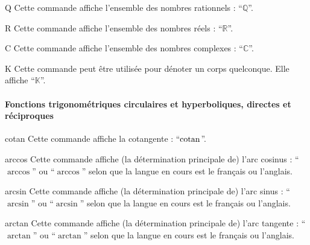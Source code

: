 \begin{docCommand}{Q}{}
  Cette commande affiche l'ensemble des nombres rationnels :
  \enquote{$\mathbb{Q}$}.
\end{docCommand}

\begin{docCommand}{R}{}
  Cette commande affiche l'ensemble des nombres réels : \enquote{$\mathbb{R}$}.
\end{docCommand}

\begin{docCommand}{C}{}
  Cette commande affiche l'ensemble des nombres complexes :
  \enquote{$\mathbb{C}$}.
\end{docCommand}

\begin{docCommand}{K}{}
  Cette commande peut être utilisée pour dénoter un corps quelconque. Elle
  affiche \enquote{$\mathbb{K}$}.
\end{docCommand}

\paragraph{Fonctions trigonométriques circulaires et hyperboliques, directes et
  réciproques}

\begin{docCommand}{cotan}{}
  Cette commande affiche la cotangente : \enquote{$\operatorname{cotan}$}.
\end{docCommand}

\begin{docCommand}{arccos}{}
  Cette commande affiche (la détermination principale de) l'arc cosinus :
  \enquote{$\arccos$} ou
  \enquote{$\arccos$} selon que
  la langue en cours est le français ou l'anglais.
\end{docCommand}

\begin{docCommand}{arcsin}{}
  Cette commande affiche (la détermination principale de) l'arc sinus :
  \enquote{$\arcsin$} ou
  \enquote{$\arcsin$} selon que
  la langue en cours est le français ou l'anglais.
\end{docCommand}

\begin{docCommand}{arctan}{}
  Cette commande affiche (la détermination principale de) l'arc tangente :
  \enquote{$\arctan$} ou
  \enquote{$\arctan$} selon que
  la langue en cours est le français ou l'anglais.
\end{docCommand}

